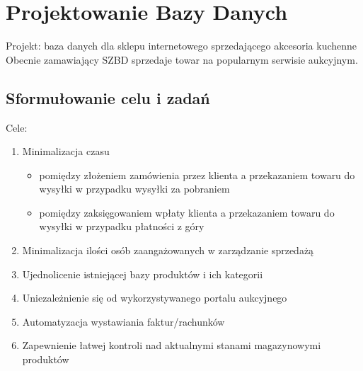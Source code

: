 \chapter{Projektowanie Bazy Danych}
Projekt: baza danych dla sklepu internetowego sprzedającego akcesoria kuchenne\\
Obecnie zamawiający SZBD sprzedaje towar na popularnym serwisie aukcyjnym.\\ 
\section{Sformułowanie celu i zadań}
Cele:
\begin{enumerate}
\item Minimalizacja czasu
\begin{itemize}
\item pomiędzy złożeniem zamówienia przez klienta a przekazaniem towaru do wysyłki w przypadku wysyłki za pobraniem
\item pomiędzy zaksięgowaniem wpłaty klienta a przekazaniem towaru do wysyłki w przypadku płatności z góry 
\end{itemize} 
\item Minimalizacja ilości osób zaangażowanych w zarządzanie sprzedażą
\item Ujednolicenie istniejącej bazy produktów i ich kategorii
\item Uniezależnienie się od wykorzystywanego portalu aukcyjnego
\item Automatyzacja wystawiania faktur/rachunków
\item Zapewnienie łatwej kontroli nad aktualnymi stanami magazynowymi produktów 
\end{enumerate}

